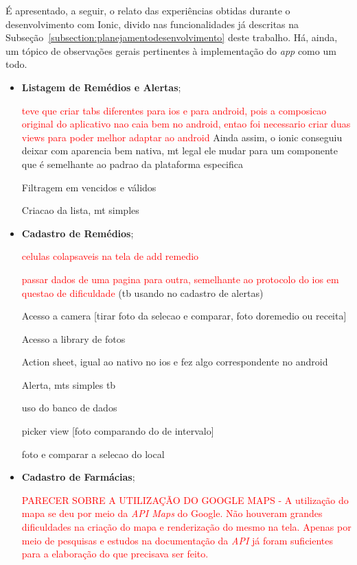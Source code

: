 É apresentado, a seguir, o relato das experiências obtidas durante o desenvolvimento com Ionic, divido nas funcionalidades 
já descritas na Subseção~\ref{subsection:planejamentodesenvolvimento} deste trabalho.
Há, ainda, um tópico de observações gerais pertinentes à implementação do \textit{app} como um todo.


 \begin{itemize}
 	
 	\item \textbf{Listagem de Remédios e Alertas};
 	
 	\textcolor{red}{teve que criar tabs diferentes para ios e para android, pois a composicao original do aplicativo nao caia bem no android, entao foi necessario criar duas views para poder melhor adaptar ao android}
 	Ainda assim, o ionic conseguiu deixar com aparencia bem nativa, mt legal ele mudar para um componente que é semelhante ao padrao da plataforma especifica
 	
 	Filtragem em vencidos e válidos
 	
 	Criacao da lista, mt simples
 	
 	
 	\item \textbf{Cadastro de Remédios};
 	
 	\textcolor{red}{celulas colapsaveis na tela de add remedio}
 	
 	\textcolor{red}{passar dados de uma pagina para outra, semelhante ao protocolo do ios em questao de dificuldade} (tb usando no cadastro de alertas)
 	
 	Acesso a camera [tirar foto da selecao e comparar, foto doremedio ou receita]
 	
 	Acesso a library de fotos
 	
 	Action sheet, igual ao nativo no ios e fez algo correspondente no android
 	
 	Alerta, mts simples tb
 	
 	uso do banco de dados
 	
 	picker view [foto comparando do de intervalo]
 	
 	foto e comparar a selecao do local
 	
 	
 	
 	\item \textbf{Cadastro de Farmácias};
 	
 	\textcolor{red}{PARECER SOBRE A UTILIZAÇÃO DO GOOGLE MAPS - A utilização do mapa se deu por meio da \textit{API Maps} do Google. Não houveram grandes dificuldades na criação do mapa e renderização do mesmo na tela. Apenas por meio de pesquisas e estudos na documentação
 		da \textit{API} já foram suficientes para a elaboração do que precisava ser feito. }
 	

\end{itemize}
